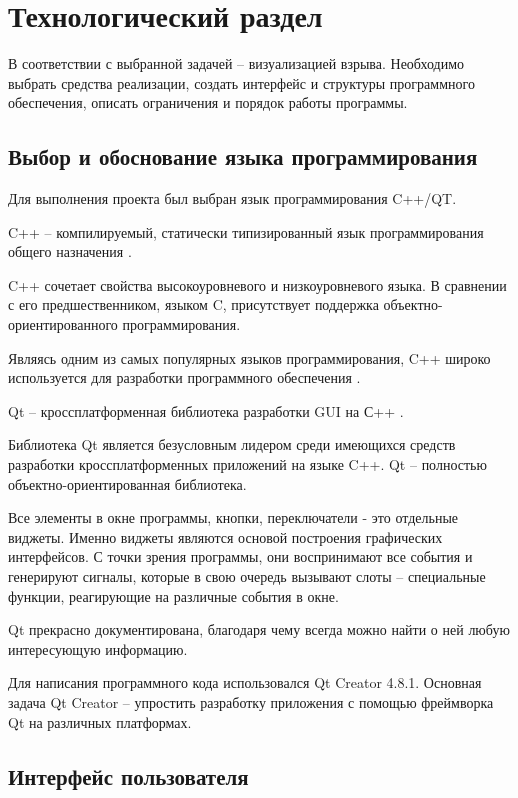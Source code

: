\chapter{\textbf{Технологический раздел}}

\hfill

В соответствии с выбранной задачей -- визуализацией взрыва. Необходимо выбрать средства реализации, создать интерфейс и структуры программного обеспечения, описать ограничения и порядок работы программы. 

\section{\textbf{Выбор и обоснование языка программирования }}

Для выполнения проекта был выбран язык программирования C++/QT.

C++ -- компилируемый, статически типизированный язык программирования общего назначения \cite{c++}. 

C++ сочетает свойства высокоуровневого и низкоуровневого языка. В сравнении с его предшественником, языком C, присутствует поддержка объектно-ориентированного программирования.

Являясь одним из самых популярных языков программирования, C++ широко используется для разработки программного обеспечения \cite{usingc++}. 

Qt -- кроссплатформенная библиотека разработки GUI на С++ \cite{qt}.

Библиотека Qt является безусловным лидером среди имеющихся средств разработки кроссплатформенных приложений на языке C++. Qt – полностью объектно-ориентированная библиотека.

Все элементы в окне программы, кнопки, переключатели - это отдельные виджеты. Именно виджеты являются основой построения графических интерфейсов. С точки зрения программы, они воспринимают все
события и генерируют сигналы, которые в свою очередь вызывают слоты – специальные функции, реагирующие на различные события в окне. 

Qt прекрасно документирована, благодаря чему всегда можно найти о ней любую интересующую информацию.

Для написания программного кода использовался Qt Creator 4.8.1. Основная задача Qt Creator -- упростить разработку приложения с помощью фреймворка Qt на различных платформах.

\section{\textbf{Интерфейс пользователя }}

